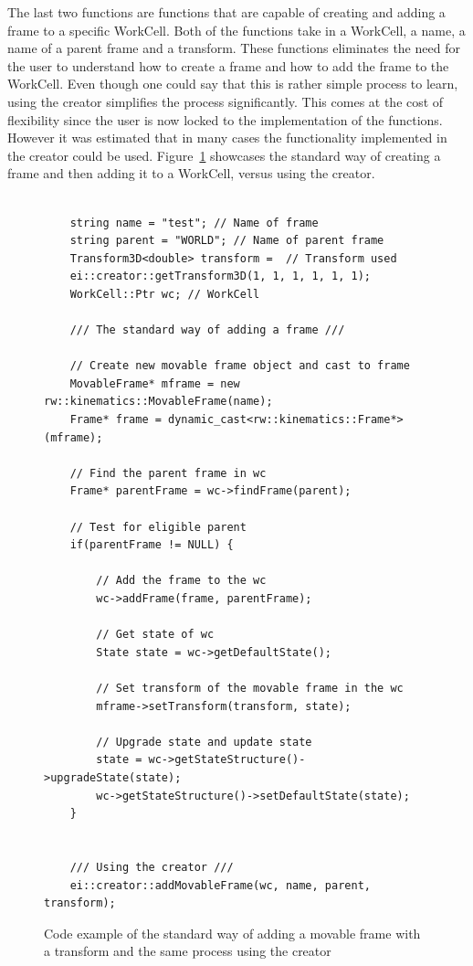 The last two functions are functions that are capable of creating and adding a frame to a specific WorkCell. Both of the functions take in a WorkCell, a name, a name of a parent frame and a transform. These functions eliminates the need for the user to understand how to create a frame and how to add the frame to the WorkCell. Even though one could say that this is rather simple process to learn, using the creator simplifies the process significantly. This comes at the cost of flexibility since the user is now locked to the implementation of the functions. However it was estimated that in many cases the functionality implemented in the creator could be used. Figure~\ref{fig:CodeExampleAddFrameDifference} showcases the standard way of creating a frame and then adding it to a WorkCell, versus using the creator.

\begin{figure}[h]
	\centering
	\lstset{language=C++} 
	\begin{lstlisting}[frame=single]

	string name = "test"; // Name of frame
	string parent = "WORLD"; // Name of parent frame
	Transform3D<double> transform =  // Transform used
	ei::creator::getTransform3D(1, 1, 1, 1, 1, 1);
	WorkCell::Ptr wc; // WorkCell

	/// The standard way of adding a frame ///
	
	// Create new movable frame object and cast to frame
	MovableFrame* mframe = new rw::kinematics::MovableFrame(name);
    Frame* frame = dynamic_cast<rw::kinematics::Frame*>(mframe);
    
    // Find the parent frame in wc
    Frame* parentFrame = wc->findFrame(parent);
	
	// Test for eligible parent
	if(parentFrame != NULL) {
	
		// Add the frame to the wc
        wc->addFrame(frame, parentFrame);
		
		// Get state of wc
		State state = wc->getDefaultState();
		
		// Set transform of the movable frame in the wc
		mframe->setTransform(transform, state);
		
		// Upgrade state and update state
		state = wc->getStateStructure()->upgradeState(state); 
		wc->getStateStructure()->setDefaultState(state); 
    }
	
	
	/// Using the creator ///
	ei::creator::addMovableFrame(wc, name, parent, transform);

	\end{lstlisting}
	\caption{Code example of the standard way of adding a movable frame with a transform and the same process using the creator}
	\label{fig:CodeExampleAddFrameDifference}
\end{figure}

